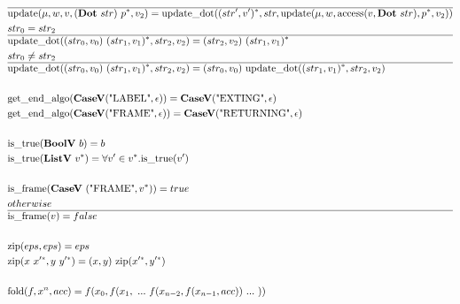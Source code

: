 \begin{align*}
  \hline
  &\update(\mu, w, v, (\dotp ~ str) ~ \seq{p}, v_2)
  =
  \updatedot(\seq{(str', v')}, str, \update(\mu, w, \access(v, \dotp ~ str), \seq{p}, v_2)) \\
  &str_0 = str_2 \\
  \hline
  &\updatedot((str_0, v_0) ~ \seq{(str_1, v_1)}, str_2, v_2)
  =
  (str_2, v_2) ~ \seq{(str_1, v_1)} \\
  &str_0 \not= str_2 \\
  \hline
  &\updatedot((str_0, v_0) ~ \seq{(str_1, v_1)}, str_2, v_2)
  =
  (str_0, v_0) ~ \updatedot(\seq{(str_1, v_1)}, str_2, v_2) \\
%
\newline \\
  &\getendalgo(\casev(\text{"LABEL"}, \epsilon)) = \casev(\text{"EXTING"}, \epsilon) \\
  &\getendalgo(\casev(\text{"FRAME"}, \epsilon)) = \casev(\text{"RETURNING"}, \epsilon) \\
%
\newline \\
  &\istrue(\boolv ~ b) = b \\
  &\istrue(\listv ~ \seq v) = \forall v' \in \seq v. \istrue (v') \\
%
\newline \\
  &\isframe(\casev ~ (\text{"FRAME"}, \seq v)) = true \\
  &otherwise \\
  \hline
  &\isframe(v) = false \\
%
\newline \\
  &\zip(eps, eps) = eps \\
  &\zip(x ~ \seq{x'}, y ~ \seq{y'}) = (x, y) ~ \zip (\seq{x'}, \seq{y'}) \\
%
\newline \\
  &\fold(f, x^n, acc) = f(x_0, f(x_1, ~ ... ~ f(x_{n-2}, f(x_{n-1}, acc)) ~ ... ~ ))
\end{align*}






